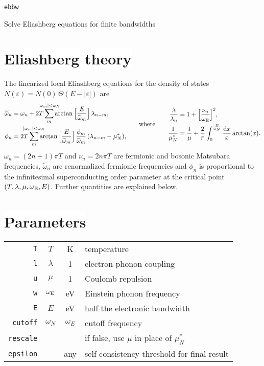 \documentclass[a4paper]{article}
\def\D{\mathrm d}
\def\sub#1{\sb{\mathrm{#1}}}
\def\limit#1{\sp{\mathclap{#1}}}
\let\tilde\widetilde
\let\epsilon\varepsilon
\let\Theta\varTheta
\def\headline#1{\section*{\normalsize\normalfont%
   \rlap{\rule[0.5ex]{\textwidth}{0.4pt}}\qquad\colorbox{white}{#1}}}
\begin{document}
   \begin{center}
      \LARGE \texttt{ebbw} \par \bigskip
      \large Solve Eliashberg equations for finite bandwidths
   \end{center}

   \headline{Eliashberg theory}

   The linearized local Eliashberg equations for the density of states
   $N(\epsilon) = N(0) \, \Theta(E - |\epsilon|)$ are
   \begin{align*}
      \begin{aligned}
         \tilde \omega_n &= \omega_n + 2 T \sum_m \limit{|\omega_m| < \omega_N}
         \arctan \Big[ \frac E {\tilde \omega_m} \Big] \, \lambda_{n - m},
         \\
         \phi_n &= 2 T \sum_m \limit{|\omega_m| < \omega_N}
         \arctan \Big[ \frac E {\tilde \omega_m} \Big] \,
         \frac{\phi_m}{\tilde \omega_m} \, (\lambda_{n - m} - \mu^*_N),
      \end{aligned}
      \qquad \text{where} \qquad
      \begin{aligned}
         \frac \lambda {\lambda_n} &=
         1 + \Big[ \frac{\nu_n}{\omega \sub E} \Big]^2,
         \\
         \frac 1 {\mu^*_N} &=
         \frac 1 \mu + \frac 2 \pi \int_0^{\frac E {\omega_N}} \frac {\D x} x
         \arctan(x).
      \end{aligned}
   \end{align*}
   $\omega_n = (2 n + 1) \pi T$ and $\nu_n = 2 n \pi T$ are fermionic and
   bosonic Matsubara frequencies, $\tilde \omega_n$ are renormalized fermionic
   frequencies and $\phi_n$ is proportional to the infinitesimal superconducting
   order parameter at the critical point $(T, \lambda, \mu, \omega \sub E, E)$.
   Further quantities are explained below.

   \headline{Parameters}

   \begin{center}
      \begin{tabular}{r c c l}
         \verb|T| & $T$ & K & temperature \\
         \verb|l| & $\lambda$ & 1 & electron-phonon coupling \\
         \verb|u| & $\mu$ & 1 & Coulomb repulsion \\
         \verb|w| & $\omega \sub E$ & eV & Einstein phonon frequency \\
         \verb|E| & $E$ & eV & half the electronic bandwidth \\
         [2mm]
         \verb|cutoff| & $\omega_N$ & $\omega_E$ & cutoff frequency \\
         \verb|rescale| & & & if false, use $\mu$ in place of $\mu^*_N$ \\
         \verb|epsilon| & & any & self-consistency threshold for final result
      \end{tabular}
   \end{center}
\end{document}
